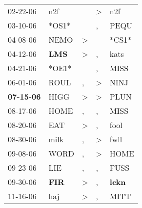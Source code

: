 \begin{supertabular}{p{0.07\textwidth}p{0.06\textwidth}p{0.02\textwidth}p{0.02\textwidth}p{0.06\textwidth}}
          02-22-06\textsuperscript{} &            n2f\textsuperscript{} &                  &     \textgreater &            n2f\textsuperscript{} \\
          03-10-06\textsuperscript{} &                            *OS1* &                  &                , &           PEQU\textsuperscript{} \\
          04-08-06\textsuperscript{} &           NEMO\textsuperscript{} &     \textgreater &                  &                            *CS1* \\
          04-12-06\textsuperscript{} &   \textbf{LMS\textsuperscript{}} &     \textgreater &                , &           kats\textsuperscript{} \\
          04-21-06\textsuperscript{} &                            *OE1* &                  &                , &           MISS\textsuperscript{} \\
          06-01-06\textsuperscript{} &           ROUL\textsuperscript{} &                , &     \textgreater &           NINJ\textsuperscript{} \\
 \textbf{07-15-06\textsuperscript{}} &           HIGG\textsuperscript{} &     \textgreater &     \textgreater &           PLUN\textsuperscript{} \\
          08-17-06\textsuperscript{} &           HOME\textsuperscript{} &                , &                , &           MISS\textsuperscript{} \\
          08-20-06\textsuperscript{} &            EAT\textsuperscript{} &     \textgreater &                , &           fool\textsuperscript{} \\
          08-30-06\textsuperscript{} &           milk\textsuperscript{} &                , &     \textgreater &           fwll\textsuperscript{} \\
          09-08-06\textsuperscript{} &           WORD\textsuperscript{} &                , &     \textgreater &           HOME\textsuperscript{} \\
          09-23-06\textsuperscript{} &            LIE\textsuperscript{} &                , &                , &           FUSS\textsuperscript{} \\
          09-30-06\textsuperscript{} &   \textbf{FIR\textsuperscript{}} &     \textgreater &                , &  \textbf{lckn\textsuperscript{}} \\
          11-16-06\textsuperscript{} &            haj\textsuperscript{} &     \textgreater &                , &           MITT\textsuperscript{} \\

\end{supertabular}

